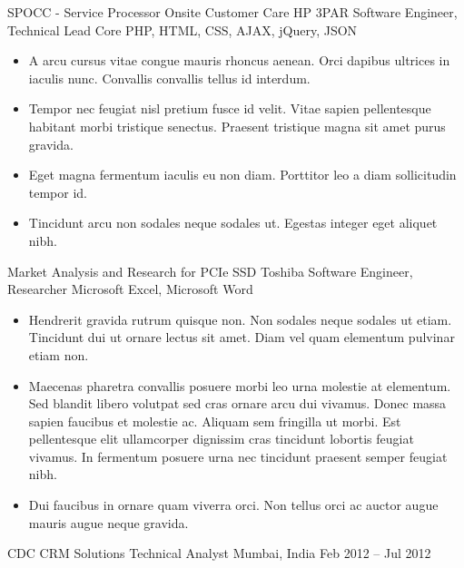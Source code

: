 \documentclass[10pt, a4paper]{cvhari}
\begin{document}
        \dividergray

        \project
            {SPOCC - Service Processor Onsite Customer Care}
            {HP 3PAR}
            {Software Engineer, Technical Lead}
            {Core PHP, HTML, CSS, AJAX, jQuery, JSON}
        
        \begin{itemize}
            \item A arcu cursus vitae congue mauris rhoncus aenean. Orci dapibus ultrices in iaculis nunc. Convallis convallis tellus id interdum.\smallskip
            \item Tempor nec feugiat nisl pretium fusce id velit. Vitae sapien pellentesque habitant morbi tristique senectus. Praesent tristique magna sit amet purus gravida.\smallskip
            \item Eget magna fermentum iaculis eu non diam. Porttitor leo a diam sollicitudin tempor id.\smallskip
            \item Tincidunt arcu non sodales neque sodales ut. Egestas integer eget aliquet nibh. \smallskip
        \end{itemize}
        
        \dividergray
        
        \project
            {Market Analysis and Research for PCIe SSD}
            {Toshiba}
            {Software Engineer, Researcher}
            {Microsoft Excel, Microsoft Word}
        
        \begin{itemize}
            \item Hendrerit gravida rutrum quisque non. Non sodales neque sodales ut etiam. Tincidunt dui ut ornare lectus sit amet. Diam vel quam elementum pulvinar etiam non.\smallskip
            \item  Maecenas pharetra convallis posuere morbi leo urna molestie at elementum. Sed blandit libero volutpat sed cras ornare arcu dui vivamus. Donec massa sapien faucibus et molestie ac. Aliquam sem fringilla ut morbi. Est pellentesque elit ullamcorper dignissim cras tincidunt lobortis feugiat vivamus. In fermentum posuere urna nec tincidunt praesent semper feugiat nibh.\smallskip
            \item  Dui faucibus in ornare quam viverra orci. Non tellus orci ac auctor augue mauris augue neque gravida.\smallskip
        \end{itemize}


\smallskip
\divider
\smallskip

    \company
        {CDC CRM Solutions}
        {Technical Analyst}
        {Mumbai, India}
        {Feb 2012 – Jul 2012}
        
\end{document}
